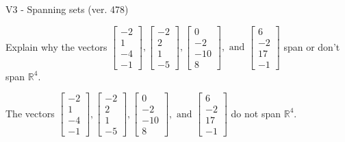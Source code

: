 \begin{exercise}
  \begin{exerciseTitle}V3 - Spanning sets (ver. 478)\end{exerciseTitle}
  \begin{exerciseStatement}
    Explain why the vectors \(\left[\begin{array}{r}
-2 \\
1 \\
-4 \\
-1
\end{array}\right] , \left[\begin{array}{r}
-2 \\
2 \\
1 \\
-5
\end{array}\right] , \left[\begin{array}{r}
0 \\
-2 \\
-10 \\
8
\end{array}\right] , \text{ and } \left[\begin{array}{r}
6 \\
-2 \\
17 \\
-1
\end{array}\right]\) span or don't span \(\mathbb{R}^4\). 
	


  \end{exerciseStatement}
  \begin{exerciseAnswer}
   The vectors \(\left[\begin{array}{r}
-2 \\
1 \\
-4 \\
-1
\end{array}\right] , \left[\begin{array}{r}
-2 \\
2 \\
1 \\
-5
\end{array}\right] , \left[\begin{array}{r}
0 \\
-2 \\
-10 \\
8
\end{array}\right] , \text{ and } \left[\begin{array}{r}
6 \\
-2 \\
17 \\
-1
\end{array}\right]\) 
  	 do not  
	span \(\mathbb{R}^4\).
  


  \end{exerciseAnswer}
\end{exercise}